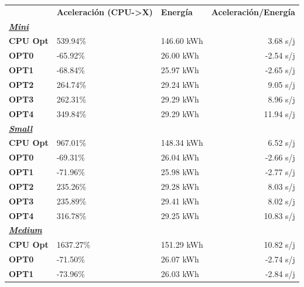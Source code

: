 \begin{table}[H]
    \centering
    \begin{tabular}{lllr}
    \rowcolor[HTML]{DAE8FC} \ & \textbf{Aceleración (CPU->X)} & \textbf{	Energía} & \textbf{	Aceleración/Energía} \\
    \cellcolor[HTML]{DAE8FC} \textbf{\textbf{{\emph{{\underline{{Mini}}}}}}} & &	&	 \\
    \rowcolor[HTML]{EFEFEF} \cellcolor[HTML]{DAE8FC} \textbf{CPU Opt} &539.94\%  &	146.60 kWh  &	3.68 s/j \\
    \cellcolor[HTML]{DAE8FC} \textbf{OPT0} & -65.92\%  &	26.00 kWh  &	-2.54 s/j \\
    \rowcolor[HTML]{EFEFEF} \cellcolor[HTML]{DAE8FC} \textbf{OPT1} &-68.84\%  &	25.97 kWh  &	-2.65 s/j \\
    \cellcolor[HTML]{DAE8FC} \textbf{OPT2} & 264.74\%  &	29.24 kWh  &	9.05 s/j \\
    \rowcolor[HTML]{EFEFEF} \cellcolor[HTML]{DAE8FC} \textbf{OPT3} &262.31\%  &	29.29 kWh  &	8.96 s/j \\
    \cellcolor[HTML]{DAE8FC} \textbf{OPT4} & 349.84\%  &	29.29 kWh  &	11.94 s/j \\
    \rowcolor[HTML]{EFEFEF} \cellcolor[HTML]{DAE8FC} \textbf{\textbf{{\emph{{\underline{{Small}}}}}}} &&	&	 \\
    \cellcolor[HTML]{DAE8FC} \textbf{CPU Opt} & 967.01\%  &	148.34 kWh  &	6.52 s/j \\
    \rowcolor[HTML]{EFEFEF} \cellcolor[HTML]{DAE8FC} \textbf{OPT0} &-69.31\%  &	26.04 kWh  &	-2.66 s/j \\
    \cellcolor[HTML]{DAE8FC} \textbf{OPT1} & -71.96\%  &	25.98 kWh  &	-2.77 s/j \\
    \rowcolor[HTML]{EFEFEF} \cellcolor[HTML]{DAE8FC} \textbf{OPT2} &235.26\%  &	29.28 kWh  &	8.03 s/j \\
    \cellcolor[HTML]{DAE8FC} \textbf{OPT3} & 235.89\%  &	29.41 kWh  &	8.02 s/j \\
    \rowcolor[HTML]{EFEFEF} \cellcolor[HTML]{DAE8FC} \textbf{OPT4} &316.78\%  &	29.25 kWh  &	10.83 s/j \\
    \cellcolor[HTML]{DAE8FC} \textbf{\textbf{{\emph{{\underline{{Medium}}}}}}} & &	&	 \\
    \rowcolor[HTML]{EFEFEF} \cellcolor[HTML]{DAE8FC} \textbf{CPU Opt} &1637.27\%  &	151.29 kWh  &	10.82 s/j \\
    \cellcolor[HTML]{DAE8FC} \textbf{OPT0} & -71.50\%  &	26.07 kWh  &	-2.74 s/j \\
    \rowcolor[HTML]{EFEFEF} \cellcolor[HTML]{DAE8FC} \textbf{OPT1} &-73.96\%  &	26.03 kWh  &	-2.84 s/j \\

\end{tabular}
\end{table}

